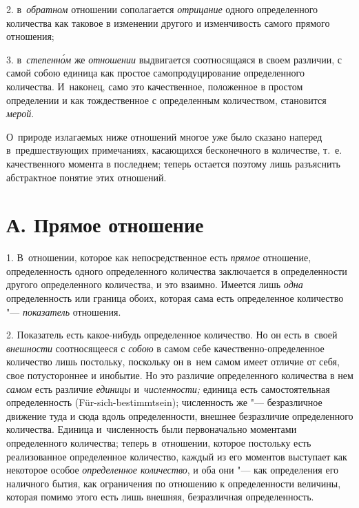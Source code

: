2. в~{\em обратном} отношении сополагается {\em отрицание} одного определенного
количества как таковое в изменении другого и изменчивость самого прямого
отношения;

3. в~{\em степенн\'{о}м} же {\em отношении} выдвигается соотносящаяся в своем
различии, с самой собою единица как простое самопродуцирование определенного
количества. И~наконец, само это качественное, положенное в простом определении
и как тождественное с определенным количеством, становится {\em мерой}.

О~природе излагаемых ниже отношений многое уже было сказано наперед
в~предшествующих примечаниях, касающихся бесконечного в количестве, т.~е.
качественного момента в последнем; теперь остается поэтому лишь разъяснить
абстрактное понятие этих отношений.

\section[А. Прямое отношение]{А. Прямое отношение}

1. В~отношении, которое как непосредственное есть {\em прямое} отношение,
определенность одного определенного количества заключается в определенности
другого определенного количества, и это взаимно. Имеется лишь {\em одна}
определенность или граница обоих, которая сама есть определенное количество
"--- {\em показатель} отношения.

2. Показатель есть какое-нибудь определенное количество. Но он есть в~своей
{\em внешности} соотносящееся с {\em собою} в самом себе
качественно-определенное количество лишь постольку, поскольку он в~нем самом
имеет отличие от себя, свое потустороннее и инобытие. Но это различие
определенного количества в нем {\em самом} есть различие {\em единицы}
и~{\em численности;} единица есть самостоятельная определенность
(Für-sich-bestimmtsein); численность же "--- безразличное движение туда и сюда
вдоль определенности, внешнее безразличие определенного количества. Единица
и~численность были первоначально моментами определенного количества; теперь
в~отношении, которое постольку есть реализованное определенное количество,
каждый из его моментов выступает как некоторое особое {\em определенное
количество}, и оба они "--- как определения его наличного бытия, как
ограничения по отношению к определенности величины, которая помимо этого есть
лишь внешняя, безразличная определенность.

